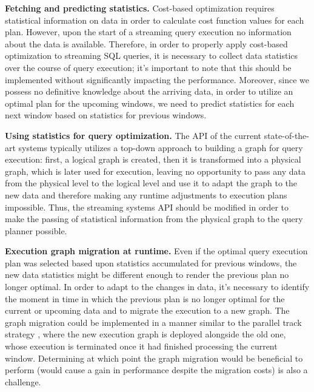 \label {sec:fs-optimization-challenges}

\textbf{Fetching and predicting statistics.} Cost-based optimization requires statistical information on data in order to calculate cost function values for each plan. However, upon the start of a streaming query execution no information about the data is available. Therefore, in order to properly apply cost-based optimization to streaming SQL queries, it is necessary to collect data statistics over the course of query execution; it's important to note that this should be implemented without significantly impacting the performance. Moreover, since we possess no definitive knowledge about the arriving data, in order to utilize an optimal plan for the upcoming windows, we need to predict statistics for each next window based on statistics for previous windows.

\textbf{Using statistics for query optimization.} The API of the current state-of-the-art systems typically utilizes a top-down approach to building a graph for query execution: first, a logical graph is created, then it is transformed into a physical graph, which is later used for execution, leaving no opportunity to pass any data from the physical level to the logical level and use it to adapt the graph to the new data and therefore making any runtime adjustments to execution plans impossible. Thus, the streaming systems API should be modified in order to make the passing of statistical information from the physical graph to the query planner possible.

\textbf{Execution graph migration at runtime.} Even if the optimal query execution plan was selected based upon statistics accumulated for previous windows, the new data statistics might be different enough to render the previous plan no longer optimal. In order to adapt to the changes in data, it's necessary to identify the moment in time in which the previous plan is no longer optimal for the current or upcoming data and to migrate the execution to a new graph. The graph migration could be implemented in a manner similar to the parallel track strategy \cite{zhu2004dynamic}, where the new execution graph is deployed alongside the old one, whose execution is terminated once it had finished processing the current window. Determining at which point the graph migration would be beneficial to perform (would cause a gain in performance despite the migration costs) is also a challenge.